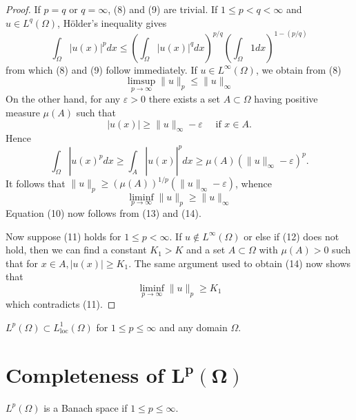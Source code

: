 \begin{proof}
  If $p=q$ or $q=\infty$, (8) and (9) are trivial. If $1 \leq p<q<\infty$ and $u \in L^q(\Omega)$, Hölder's inequality gives
  \[
  \int_{\Omega}|u(x)|^p d x \leq\left(\int_{\Omega}|u(x)|^q d x\right)^{p / q}\left(\int_{\Omega} 1 d x\right)^{1-(p / q)}
  \]
  from which (8) and (9) follow immediately. If $u \in L^{\infty}(\Omega)$, we obtain from (8)
  \begin{equation}\label{eq:2.13}
    \limsup_{p\rightarrow \infty}\|u\|_p \leq\|u\|_{\infty}
  \end{equation}
  On the other hand, for any $\varepsilon>0$ there exists a set $A \subset \Omega$ having positive measure $\mu(A)$ such that
  \[
  |u(x)| \geq\|u\|_{\infty}-\varepsilon \quad \text { if } x \in A .
  \]
  Hence
  \[
  \left.\int_{\Omega}\left|u(x)^p d x \geq \int_A\right| u(x)\right|^p d x \geq \mu(A)\left(\|u\|_{\infty}-\varepsilon\right)^p .
  \]
  It follows that $\|u\|_p \geq(\mu(A))^{1 / p}\left(\|u\|_{\infty}-\varepsilon\right)$, whence
  \begin{equation}\label{eq:2.14}
    \liminf_{p \rightarrow \infty}\|u\|_p \geq\|u\|_{\infty}
  \end{equation}
  Equation (10) now follows from (13) and (14).
  
  Now suppose (11) holds for $1 \leq p<\infty$. If $u \notin L^{\infty}(\Omega)$ or else if (12) does not hold, then we can find a constant $K_1>K$ and a set $A \subset \Omega$ with $\mu(A)>0$ such that for $x \in A,|u(x)| \geq K_1$. The same argument used to obtain (14) now shows that
  \[
  \liminf _{p \rightarrow \infty}\|u\|_p \geq K_1
  \]
  which contradicts (11).
\end{proof}

\begin{corollary}
  $L^p(\Omega) \subset L_{\mathrm{loc}}^1(\Omega)$ for $1 \leq p \leq \infty$ and any domain $\Omega$.
\end{corollary}


\section[Completeness of $L^p(\Omega)$]{Completeness of $\bm{L^p(\Omega)}$}

\begin{theorem}
  $L^p(\Omega)$ is a Banach space if $1 \leq p \leq \infty$.
\end{theorem}

